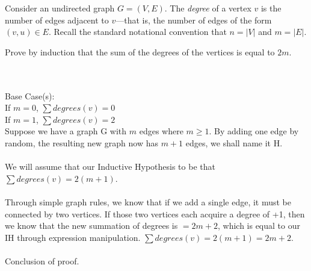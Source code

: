 \documentclass[11pt]{article}
\theoremstyle{definition}
\theoremstyle{theorem}
\newcommand{\solution}{\medskip\noindent{\color{DarkBlue}\textbf{Solution:}}}
\begin{document}
\renewcommand{\deg}{\mathit{deg}}

Consider an undirected graph $G=(V,E)$. The {\em degree} of a vertex $v$ is the number of edges adjacent to $v$---that is, the number of edges of the form $(v,u) \in E$.  Recall the standard notational convention that $n = |V|$ and $m = |E|$.

 Prove by induction that the sum of the degrees of the vertices is equal to $2m$.

\solution \\\\
Base Case(s): \\
If $m = 0$, $\sum degrees(v) = 0$\\
If $m = 1$, $\sum degrees(v) = 2$\\
Suppose we have a graph G with $m$ edges where $m \ge 1$. 
By adding one edge by random, the resulting new 
graph now has $m+1$ edges, we shall name it H.
\\\\We will assume that our Inductive Hypothesis to be that 
$\sum degrees(v) = 2(m+1)$.\\\\
Through simple graph rules, 
we know that if we add a single edge, it must be connected by two vertices.
If those two vertices each acquire a degree of +1, then we know that 
the new summation of degrees is $ = 2m + 2$, which is equal to our IH through expression manipulation.
$\sum degrees(v) = 2(m+1) = 2m + 2$.\\\\Conclusion of proof.
\end{document}
